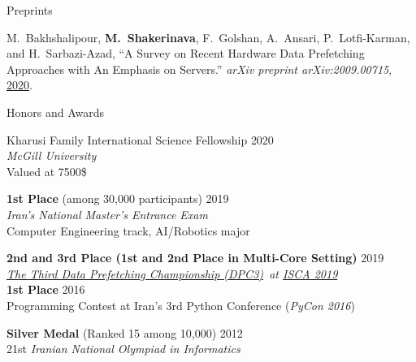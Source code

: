 \documentclass{resume}
\newcommand{\InternalSpace}{\vspace{0.18cm}}
\renewcommand{\textapprox}{\raisebox{0.5ex}{\texttildelow}}
\newenvironment{MySection}[1]
{\begin{category}{#1}}
{\end{category}}
\newcommand{\MyItem}{\citembullet}
\def \ISCAXIX {\href{https://iscaconf.org/isca2019/}{ISCA 2019}}
\def \DPCIII  {\href{https://dpc3.compas.cs.stonybrook.edu/}{The Third Data Prefetching Championship (DPC3)}}
\begin{document}
\begin{MySection}{Preprints}

\MyItem M.~Bakhshalipour, \textbf{M.~Shakerinava}, F.~Golshan, A.~Ansari, P.~Lotfi-Karman, and H.~Sarbazi-Azad, {``A Survey on Recent Hardware Data Prefetching Approaches with An Emphasis on Servers.''} \textit{arXiv preprint arXiv:2009.00715}, \href{https://arxiv.org/pdf/2009.00715.pdf}{2020}.

\end{MySection}

\InternalSpace


\begin{MySection}{Honors and Awards}

\MyItem
Kharusi Family International Science Fellowship \hfill {2020}\\
\emph{McGill University}\\
Valued at 7500\$

\MyItem
\textbf{1st Place} (among \textapprox30,000 participants) \hfill {2019}\\
\emph{Iran's National Master's Entrance Exam}\\
Computer Engineering track, AI/Robotics major

\MyItem
\textbf{2nd and 3rd Place (1st and 2nd Place in Multi-Core Setting)} \hfill {2019}\\
\emph{\DPCIII\ at \ISCAXIX}\\

\MyItem
\textbf{1st Place} \hfill {2016}\\
Programming Contest at Iran's 3rd Python Conference (\emph{PyCon 2016})

\MyItem
\textbf{Silver Medal} (Ranked \textapprox15 among \textapprox10,000) \hfill {2012}\\
21st \emph{Iranian National Olympiad in Informatics}

\end{MySection}

\InternalSpace


\end{document}
